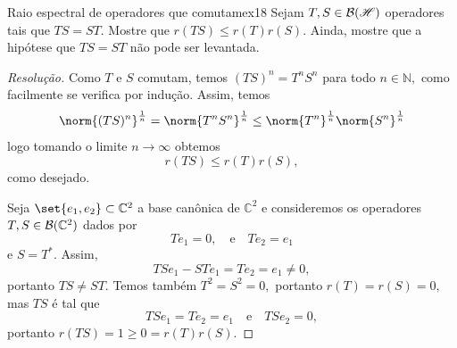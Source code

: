 \begin{exercício}{Raio espectral de operadores que comutam}{ex18}
    Sejam \(T, S \in \mathcal{B}(\mathscr{H})\) operadores tais que \(TS = ST.\) Mostre que \(r(TS) \leq r(T)r(S).\) Ainda, mostre que a hipótese que \(TS = ST\) não pode ser levantada.
\end{exercício}
\begin{proof}[Resolução]
  Como \(T\) e \(S\) comutam, temos \((TS)^n = T^nS^n\) para todo \(n \in \mathbb{N},\) como facilmente se verifica por indução. Assim, temos
  \begin{equation*}
    \norm{(TS)^n}^{\frac1n} = \norm{T^nS^n}^{\frac{1}{n}} \leq \norm{T^n}^{\frac1n} \norm{S^n}^{\frac1n}
  \end{equation*}
  logo tomando o limite \(n \to \infty\) obtemos
  \begin{equation*}
      r(TS) \leq r(T)r(S),
  \end{equation*}
  como desejado.

  Seja \(\set{e_1, e_2} \subset \mathbb{C}^2\) a base canônica de \(\mathbb{C}^2\) e consideremos os operadores \(T,S \in \mathcal{B}(\mathbb{C}^2)\) dados por
  \begin{equation*}
    Te_1 = 0,\quad\text{e}\quad
    Te_2 = e_1
  \end{equation*}
  e \(S = T^*.\) Assim,
  \begin{equation*}
      TSe_1 - STe_1 = Te_2 = e_1 \neq 0,
  \end{equation*}
  portanto \(TS \neq ST.\) Temos também \(T^2 = S^2 = 0,\) portanto \(r(T) = r(S) = 0,\) mas \(TS\) é tal que
  \begin{equation*}
    TSe_1 = Te_2 = e_1\quad\text{e}\quad
    TSe_2 = 0,
  \end{equation*}
  portanto \(r(TS) = 1 \geq 0 = r(T)r(S).\)
\end{proof}
